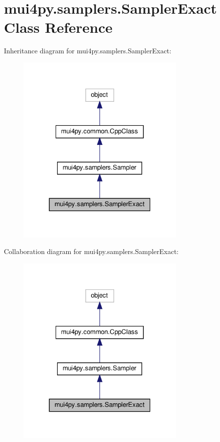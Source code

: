 \hypertarget{classmui4py_1_1samplers_1_1_sampler_exact}{}\section{mui4py.\+samplers.\+Sampler\+Exact Class Reference}
\label{classmui4py_1_1samplers_1_1_sampler_exact}


Inheritance diagram for mui4py.\+samplers.\+Sampler\+Exact\+:
\nopagebreak
\begin{figure}[H]
\begin{center}
\leavevmode
\includegraphics[width=235pt]{classmui4py_1_1samplers_1_1_sampler_exact__inherit__graph}
\end{center}
\end{figure}


Collaboration diagram for mui4py.\+samplers.\+Sampler\+Exact\+:
\nopagebreak
\begin{figure}[H]
\begin{center}
\leavevmode
\includegraphics[width=235pt]{classmui4py_1_1samplers_1_1_sampler_exact__coll__graph}
\end{center}
\end{figure}
